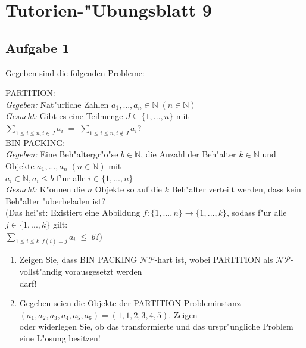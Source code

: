 \documentclass[10pt,oneside,onecolumn,a4paper,german,titlepage]{article}
\begin{document}
\section*{Tutorien-"Ubungsblatt 9}

\subsection*{Aufgabe 1}
Gegeben sind die folgenden Probleme:
\begin{tabbing}
PARTITION:\\
\textit{Gegeben:} \= Nat"urliche Zahlen $a_1,...,a_n \in \mathbb{N} \; (n \in
\mathbb{N})$\\
\textit{Gesucht:} \> Gibt es eine Teilmenge $J \subseteq \{1,...,n\}$ mit
$\sum\limits_{1 \leq i \leq n, i \in J}a_i \; = \;
\sum\limits_{1 \leq i \leq n, i \notin J}a_i$?\\[8pt]
BIN PACKING:\\
\textit{Gegeben:} \> Eine Beh"altergr"o"se $b \in \mathbb{N}$, die Anzahl der
Beh"alter $k \in \mathbb{N}$ und Objekte $a_1,...,a_n \; (n \in \mathbb{N})$ mit\\
\> $a_i \in \mathbb{N}, a_i \leq b$ f"ur alle $i \in \{1,...,n\}$\\
\textit{Gesucht:} \> K"onnen die $n$ Objekte so auf die $k$ Beh"alter verteilt
werden, dass kein Beh"alter "uberbeladen ist?\\
\> (Das hei"st: Existiert eine Abbildung $f: \{1,...,n\} \to \{1,...,k\}$,
sodass f"ur alle $j \in \{1,...,k\}$ gilt:\\
\> $\sum\limits_{1 \leq i \leq k, f(i) = j}a_i \; \leq \; b$?)
\end{tabbing}
\begin{enumerate}
\item Zeigen Sie, dass BIN PACKING $\mathcal{NP}$-hart ist, wobei PARTITION als
$\mathcal{NP}$-vollst"andig vorausgesetzt werden\\darf!
\item Gegeben seien die Objekte der PARTITION-Probleminstanz
$(a_1,a_2,a_3,a_4,a_5,a_6) = (1,1,2,3,4,5)$. Zeigen\\
oder widerlegen Sie, ob das transformierte und das urspr"ungliche Problem eine
L"osung besitzen!
\end{enumerate}
\end{document}
